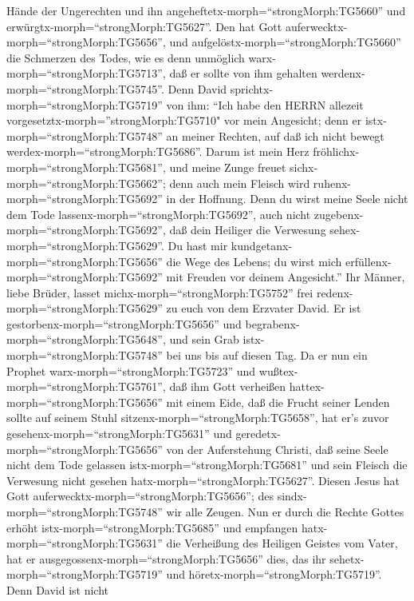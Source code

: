 Hände der Ungerechten und ihn angeheftetx-morph=``strongMorph:TG5660''
und erwürgtx-morph=``strongMorph:TG5627''.  Den hat Gott
auferwecktx-morph=``strongMorph:TG5656'', und
aufgelöstx-morph=``strongMorph:TG5660'' die Schmerzen des Todes, wie es
denn unmöglich warx-morph=``strongMorph:TG5713'', daß er sollte von ihm
gehalten werdenx-morph=``strongMorph:TG5745''.  Denn David
sprichtx-morph=``strongMorph:TG5719'' von ihm: ``Ich habe den HERRN
allezeit vorgesetztx-morph=''strongMorph:TG5710" vor mein Angesicht;
denn er istx-morph=``strongMorph:TG5748'' an meiner Rechten, auf daß ich
nicht bewegt werdex-morph=``strongMorph:TG5686''.  Darum
ist mein Herz fröhlichx-morph=``strongMorph:TG5681'', und meine Zunge
freuet sichx-morph=``strongMorph:TG5662''; denn auch mein Fleisch wird
ruhenx-morph=``strongMorph:TG5692'' in der Hoffnung.  Denn
du wirst meine Seele nicht dem Tode
lassenx-morph=``strongMorph:TG5692'', auch nicht
zugebenx-morph=``strongMorph:TG5692'', daß dein Heiliger die Verwesung
sehex-morph=``strongMorph:TG5629''.  Du hast mir
kundgetanx-morph=``strongMorph:TG5656'' die Wege des Lebens; du wirst
mich erfüllenx-morph=``strongMorph:TG5692'' mit Freuden vor deinem
Angesicht.''  Ihr Männer, liebe Brüder, lasset
michx-morph=``strongMorph:TG5752'' frei
redenx-morph=``strongMorph:TG5629'' zu euch von dem Erzvater David. Er
ist gestorbenx-morph=``strongMorph:TG5656'' und
begrabenx-morph=``strongMorph:TG5648'', und sein Grab
istx-morph=``strongMorph:TG5748'' bei uns bis auf diesen Tag.
 Da er nun ein Prophet warx-morph=``strongMorph:TG5723''
und wußtex-morph=``strongMorph:TG5761'', daß ihm Gott verheißen
hattex-morph=``strongMorph:TG5656'' mit einem Eide, daß die Frucht
seiner Lenden sollte auf seinem Stuhl
sitzenx-morph=``strongMorph:TG5658'',  hat er's zuvor
gesehenx-morph=``strongMorph:TG5631'' und
geredetx-morph=``strongMorph:TG5656'' von der Auferstehung Christi, daß
seine Seele nicht dem Tode gelassen istx-morph=``strongMorph:TG5681''
und sein Fleisch die Verwesung nicht gesehen
hatx-morph=``strongMorph:TG5627''.  Diesen Jesus hat Gott
auferwecktx-morph=``strongMorph:TG5656''; des
sindx-morph=``strongMorph:TG5748'' wir alle Zeugen.  Nun er
durch die Rechte Gottes erhöht istx-morph=``strongMorph:TG5685'' und
empfangen hatx-morph=``strongMorph:TG5631'' die Verheißung des Heiligen
Geistes vom Vater, hat er ausgegossenx-morph=``strongMorph:TG5656''
dies, das ihr sehetx-morph=``strongMorph:TG5719'' und
höretx-morph=``strongMorph:TG5719''.  Denn David ist nicht
